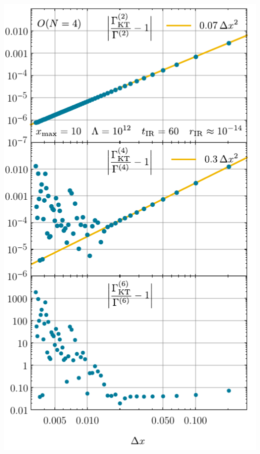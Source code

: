 	{\fullWidthTwoColumnFigureSpacing}
	{
		\includegraphics[width=\subcaptionFigureWidth+0.17cm]{0d/figures/sc_ii_n_on_4_xmax_10_lambda_1e12_tir_60_deltax_scaling.pdf} %
		\captionsetup{width=\subcaptionFigureWidth-0.17cm}%
		\caption{%
			The relative error as a function of the cell size $\Delta x$ for the numerical results (blue dots) from the KT scheme for the coefficients $\Gamma^{(2n)}$ for $n = 1, 2, 3$ with initial potential \eqref{eq:testing_scenario_phi4}.
			The numerical derivatives at $\sigma = 0$ of $u ( t_\mathrm{IR} = 60, \sigma )$ were calculated via the second-order accurate central schemes \eqref{eq:derivative_1_central_error_2}, \eqref{eq:derivative_3_central_error_2}, and \eqref{eq:derivative_5_central_error_2}.
			Here, $x_\mathrm{max} = 10$, but we could have used any sufficiently large $x_\mathrm{max}$.
			We used the exponential regulator~\eqref{eq:exponential_regulator} with \uv{} scale $\Lambda = 10^{12}$.
			The yellow straight lines $\propto \Delta x^2$ are for optical guidance.
		}%
		\label{fig:sc_ii_n_on_4_xmax_10_lambda_1e12_tir_60_deltax_scaling}%
	}
